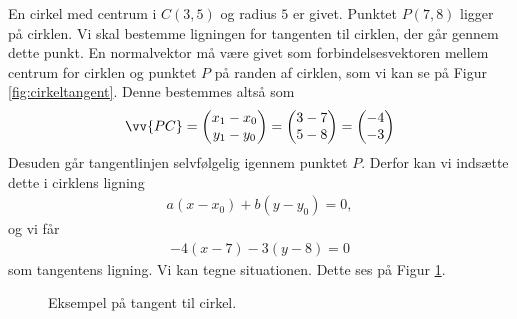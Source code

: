 \documentclass[12pt]{article}
\begin{document}
\begin{exa}
	En cirkel med centrum i $C(3,5)$ og radius $5$ er givet. Punktet $P(7, 8)$ ligger på cirklen.
	Vi skal bestemme ligningen for tangenten til cirklen, der går gennem dette punkt. En normalvektor må være givet som
	forbindelsesvektoren mellem centrum for cirklen og punktet $P$ på randen af cirklen, som vi kan se på Figur
	 \ref{fig:cirkeltangent}. Denne bestemmes altså som
	\begin{align*}
		\vv{PC} = 
		\begin{pmatrix}
			x_1 - x_0 \\
			y_1 - y_0
		\end{pmatrix} 
		=
		\begin{pmatrix} 
			3 - 7 \\
			5 - 8
		\end{pmatrix}
		=
		\begin{pmatrix}
			-4 \\
			-3
		\end{pmatrix}
	\end{align*}
	Desuden går tangentlinjen selvfølgelig igennem punktet $P$. Derfor kan vi indsætte dette i cirklens ligning
	\begin{align*}
		a(x-x_0) + b(y-y_0)=0,
	\end{align*}
	og vi får
	\begin{align*}
		-4(x-7) -3(y-8) = 0
	\end{align*}
	som tangentens ligning. 
	Vi kan tegne situationen. Dette ses på Figur \ref{fig:ctexa}.
	\begin{figure}[H]
		\centering
		\caption{Eksempel på tangent til cirkel.}
		\label{fig:ctexa}
	\end{figure}
\end{exa}
\end{document}
